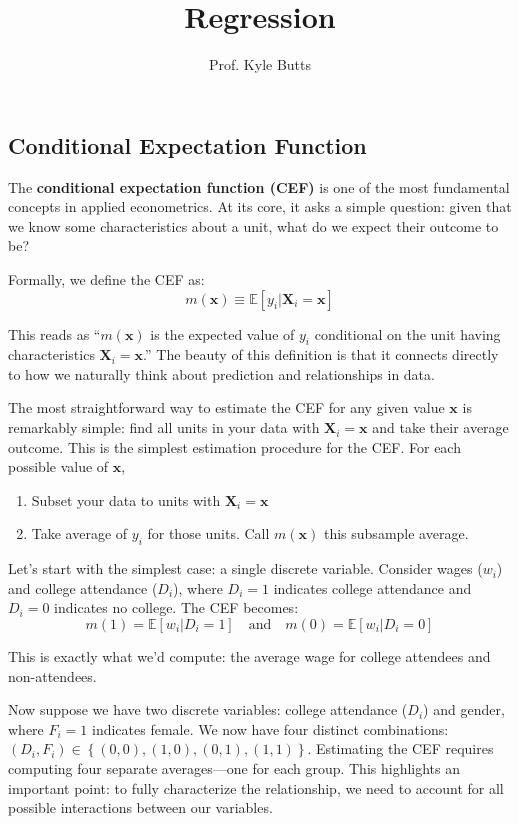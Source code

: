 \documentclass[12pt]{article}
\title{Regression}
\author{Prof. Kyle Butts}
\date{}
\begin{document}
\maketitle
\begin{multicols}{2}

\section*{Conditional Expectation Function}

The \textbf{conditional expectation function (CEF)} is one of the most fundamental concepts in applied econometrics.
At its core, it asks a simple question: given that we know some characteristics about a unit, what do we expect their outcome to be?

Formally, we define the CEF as:
$$m(\bm{x}) \equiv \mathbb{E}[y_i|\bm{X}_i = \bm{x}]$$

This reads as ``$m(\bm{x})$ is the expected value of $y_i$ conditional on the unit having characteristics $\bm{X}_i = \bm{x}$.''
The beauty of this definition is that it connects directly to how we naturally think about prediction and relationships in data.

The most straightforward way to estimate the CEF for any given value $\bm{x}$ is remarkably simple: find all units in your data with $\bm{X}_i = \bm{x}$ and take their average outcome.
This is the simplest estimation procedure for the CEF.
For each possible value of $\bm{x}$,
\begin{enumerate}
  \item Subset your data to units with $\bm{X}_i = \bm{x}$
  
  \item Take average of $y_i$ for those units. Call $m(\bm{x})$ this subsample average.
\end{enumerate}

Let's start with the simplest case: a single discrete variable.
Consider wages ($w_i$) and college attendance ($D_i$), where $D_i = 1$ indicates college attendance and $D_i = 0$ indicates no college.
The CEF becomes:
$$
  m(1) = \mathbb{E}[w_i|D_i = 1] \quad\text{and}\quad m(0) = \mathbb{E}[w_i|D_i = 0]
$$

This is exactly what we'd compute: the average wage for college attendees and non-attendees.

Now suppose we have two discrete variables: college attendance ($D_i$) and gender, where $F_i = 1$ indicates female.
We now have four distinct combinations: $(D_i, F_i) \in \left\{ (0,0), (1,0), (0,1), (1,1) \right\}$.
Estimating the CEF requires computing four separate averages---one for each group.
This highlights an important point: to fully characterize the relationship, we need to account for all possible interactions between our variables.


\end{multicols}
\end{document}

